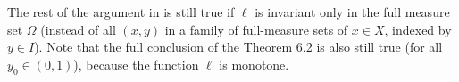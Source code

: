 \documentclass[b5paper]{report}
\begin{document}
The rest of the argument in \cite{bonifantSchwarzianDerivativesCylinder2008} is still true if \(\ell\) is invariant only in the full measure set \(\Omega\) (instead of all \((x,y)\) in a family of full-measure sets of \(x \in X\), indexed by \(y \in I\)). Note that the full conclusion of the Theorem 6.2 is also still true (for all \(y_0 \in (0,1)\)), because the function \(\ell\) is monotone.

\printbibliography



\end{document}
